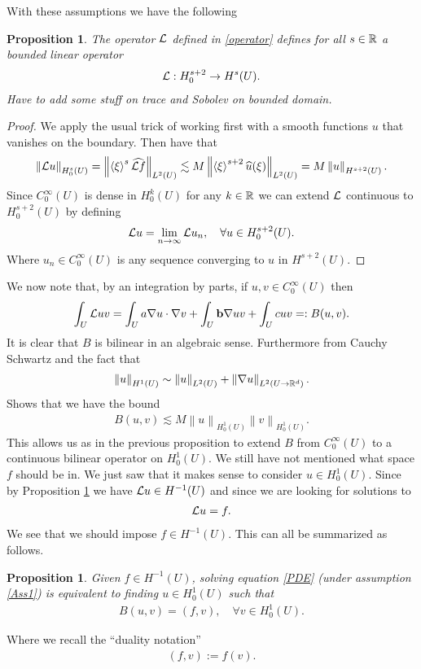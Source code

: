 \documentclass[12pt]{article}
\newtheorem{proposition}[theorem]{Proposition}
\theoremstyle{definition}
\newcommand{\red}[1]{{\color{red}#1}}
\newcommand{\br}[1]{\left\langle#1\right\rangle} \newcommand{\set}[1]{\left\{#1\right\}} \newcommand{\qp}[1]{\left(#1\right)}\newcommand{\qb}[1]{\left[#1\right]}
\renewcommand{\norm}[1]{\left\lVert #1 \right\rVert}\renewcommand{\abs}[1]{\left| #1 \right|}
\begin{document}
With these assumptions we have the following
\begin{proposition}\label{domain L}
	The operator $\mathcal{L}$ defined in \eqref{operator} defines for all $s \in \mathbb{R}$ a bounded linear operator
	\begin{align*}
		\mathcal{L} : H_0^{s+2}\to H^s (U).
	\end{align*}
	\red{Have to add some stuff on trace and Sobolev on bounded domain.}
\end{proposition}
\begin{proof}
	We apply the usual trick of working first with a smooth functions $u$ that vanishes on the boundary. Then have that
	\begin{align*}
		\norm{\Ll u}_{H^s_0(U)}=\norm{\br{\xi }^s \wh{\Ll f}}_{L^2(U)}\lesssim  M \norm{\br{\xi }^{s+2}\wh{u}(\xi )}_{L^2(U)} =M \norm{u}_{H^{s+2}(U)} .
	\end{align*}
	Since $C_0^\infty(U)$ is dense in $H^k_0(U)$ for any $k \in \mathbb{R}$ we can extend $\mathcal{L}$ continuous to $H_0^{s+2}(U)$ by defining
	\begin{align*}
		\mathcal{L} u = \lim_{n \to \infty}\mathcal{L} u_n , \quad\forall u \in  H_0^{s+2}(U).
	\end{align*}
	Where $u_n \in C_0^\infty(U)$ is any sequence converging to $u$ in  $H^{s+2}(U)$.
\end{proof}
We now note that, by an integration by parts, if $u,v \in  C_0^\infty(U)$ then \begin{align*}
	\int_{U} \mathcal{L} u v =\int_{U}a \nabla u \cdot \nabla v + \int_{U} \vb{b} \nabla  u v + \int_{U} cuv=: B(u,v)   .
\end{align*}
It is clear that $B$ is bilinear in an algebraic sense. Furthermore from Cauchy Schwartz and  the fact that
\begin{align*}
	\norm{u}_{H^1(U)}\sim \norm{u}_{L^2(U)}+\norm{\nabla u}_{L^2(U\to \R^d)}.
\end{align*}
Shows that we have the bound
\begin{align}\label{cont B}
	B(u,v)\lesssim M \norm{u}_{H_0^1(U)}\norm{v}_{H_0^1(U)}.
\end{align}
This allows us as in the previous proposition to extend $B$ from $C_0^\infty(U)$ to a continuous bilinear operator on  $H^1_0(U)$. We still have not mentioned what space $f$ should be in. We just saw that it makes sense to consider $u \in  H_0^1(U)$. Since by Proposition \ref{domain L} we have $\mathcal{L} u \in H^{-1}(U)$ and since we are looking for solutions to
\begin{align*}
	\mathcal{L} u=f.
\end{align*}
We see that we should impose $f \in H^{-1}(U)$. This can all be summarized as follows.
\begin{proposition}
	Given $f \in  H^{-1}(U)$, solving equation \eqref{PDE} (under assumption \ref{Ass1}) is equivalent to finding $u \in H_0^1(U)$ such that
	\begin{align}\label{reform}
		B(u,v)= (f,v) , \quad\forall v \in  H^{1}_0(U).
	\end{align}
\end{proposition}
Where we recall the ``duality notation''
\begin{align*}
	(f,v):= f(v) .
\end{align*}
\end{document}
